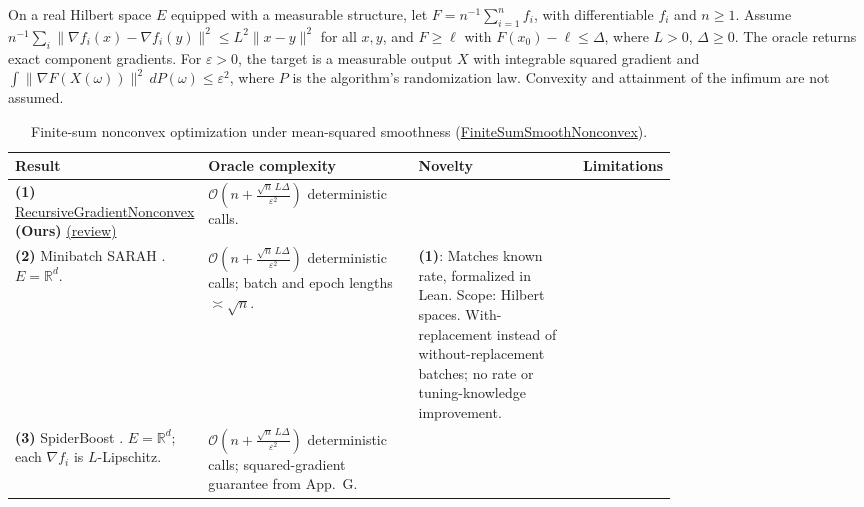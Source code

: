 \begin{table}[tp]
\centering
\caption{Finite-sum nonconvex optimization under mean-squared smoothness (\href{https://github.com/k3nfalt/longtails/blob/main/LongTails/Setups/FiniteSumSmoothNonconvex.lean}{FiniteSumSmoothNonconvex}).}\label{tab:FiniteSumSmoothNonconvex}
\parbox{\linewidth}{\footnotesize On a real Hilbert space $E$ equipped with a measurable structure, let $F=n^{-1}\sum_{i=1}^n f_i$, with differentiable $f_i$ and $n\ge1$. Assume $n^{-1}\sum_i\|\nabla f_i(x)-\nabla f_i(y)\|^2\le L^2\|x-y\|^2$ for all $x,y$, and $F\ge\ell$ with $F(x_0)-\ell\le\Delta$, where $L>0$, $\Delta\ge0$. The oracle returns exact component gradients. For $\varepsilon>0$, the target is a measurable output $X$ with integrable squared gradient and $\int\|\nabla F(X(\omega))\|^2\,dP(\omega)\le\varepsilon^2$, where $P$ is the algorithm's randomization law. Convexity and attainment of the infimum are not assumed.}\par\smallskip
\begin{threeparttable}
\footnotesize
\setlength{\tabcolsep}{4pt}\renewcommand{\arraystretch}{1.25}
\begin{tabularx}{\linewidth}{@{}>{\raggedright\arraybackslash}p{0.20\linewidth}>{\raggedright\arraybackslash}p{0.32\linewidth}>{\raggedright\arraybackslash}p{0.25\linewidth}>{\raggedright\arraybackslash}X@{}}
\toprule
\textbf{Result} & \textbf{Oracle complexity} & \textbf{Novelty} & \textbf{Limitations} \\
\midrule
\textbf{(1)} \href{https://github.com/k3nfalt/longtails/blob/main/LongTails/Theorems/RecursiveGradientNonconvex.lean}{Recursive\allowbreak Gradient\allowbreak Nonconvex} \textbf{(Ours)} \href{https://github.com/k3nfalt/longtails/blob/main/scripts/reviews/RecursiveGradientNonconvex.md}{(review)}
& $\mathcal{O}\!\left(n+\frac{\sqrt n\,L\Delta}{\varepsilon^2}\right)$ deterministic calls.
& & \\
\midrule[1.2pt]
\textbf{(2)} Minibatch SARAH \citep[Thm.~2, Cor.~3]{fsncNguyen2019v2}. $E=\mathbb{R}^d$.
& $\mathcal{O}\!\left(n+\frac{\sqrt n\,L\Delta}{\varepsilon^2}\right)$ deterministic calls; batch and epoch lengths $\asymp\sqrt n$.
& \textbf{(1)}: Matches known rate, formalized in Lean. Scope: Hilbert spaces. With-replacement instead of without-replacement batches; no rate or tuning-knowledge improvement.
& \\
\midrule
\textbf{(3)} SpiderBoost \citep[Thm.~1; App.~G, Thm.~9]{fsncWang2020v3}. $E=\mathbb{R}^d$; each $\nabla f_i$ is $L$-Lipschitz.
& $\mathcal{O}\!\left(n+\frac{\sqrt n\,L\Delta}{\varepsilon^2}\right)$ deterministic calls; squared-gradient guarantee from App.~G.

\end{tabularx}
\end{threeparttable}
\end{table}
